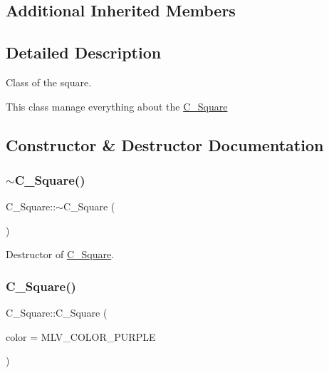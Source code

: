 \subsection*{Additional Inherited Members}


\subsection{Detailed Description}
Class of the square. 

This class manage everything about the \hyperlink{classC__Square}{C\+\_\+\+Square} 

\subsection{Constructor \& Destructor Documentation}
\mbox{\label{classC__Square_a8b63c0c06cdda3835b85c4a38692ac44}} 
\subsubsection{\texorpdfstring{$\sim$\+C\+\_\+\+Square()}{~C\_Square()}}
{\footnotesize\ttfamily C\+\_\+\+Square\+::$\sim$\+C\+\_\+\+Square (\begin{DoxyParamCaption}{ }\end{DoxyParamCaption})\hspace{0.3cm}{\ttfamily [override]}}



Destructor of \hyperlink{classC__Square}{C\+\_\+\+Square}. 

\mbox{\label{classC__Square_a3bec8a18c9b487b44585a38161cb6442}} 
\subsubsection{\texorpdfstring{C\+\_\+\+Square()}{C\_Square()}\hspace{0.1cm}{\footnotesize\ttfamily [1/3]}}
{\footnotesize\ttfamily C\+\_\+\+Square\+::\+C\+\_\+\+Square (\begin{DoxyParamCaption}\item[{M\+L\+V\+\_\+\+Color}]{color = {\ttfamily MLV\+\_\+COLOR\+\_\+PURPLE} }\end{DoxyParamCaption})\hspace{0.3cm}{\ttfamily [explicit]}}



